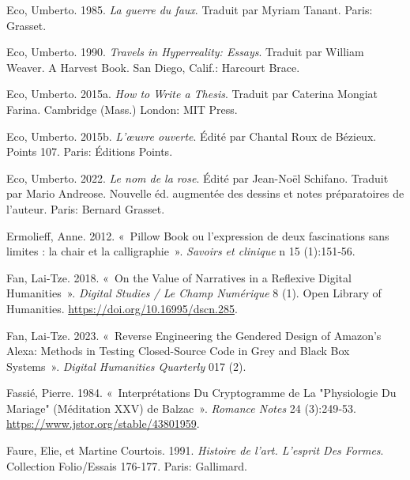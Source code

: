 \begin{CSLReferences}{1}{0}
\leavevmode{}%
Eco, Umberto. 1985. \emph{{La guerre du faux}}. Traduit par Myriam
Tanant. {Paris}: {Grasset}.

\leavevmode{}%
Eco, Umberto. 1990. \emph{Travels in {Hyperreality}: {Essays}}. Traduit
par William Weaver. A {Harvest} Book. {San Diego, Calif.}: {Harcourt
Brace}.

\leavevmode{}%
Eco, Umberto. 2015a. \emph{How to {Write} a {Thesis}}. Traduit par
Caterina Mongiat Farina. {Cambridge (Mass.) London}: {MIT Press}.

\leavevmode{}%
Eco, Umberto. 2015b. \emph{{L'{œ}uvre ouverte}}. Édité par Chantal Roux
de Bézieux. {Points} 107. {Paris}: {{É}ditions Points}.

\leavevmode{}%
Eco, Umberto. 2022. \emph{{Le nom de la rose}}. Édité par Jean-Noël
Schifano. Traduit par Mario Andreose. Nouvelle {é}d. augment{é}e des
dessins et notes pr{é}paratoires de l'auteur. {Paris}: {Bernard
Grasset}.

\leavevmode{}%
Ermolieff, Anne. 2012. {«~{Pillow Book ou l'expression de deux
fascinations sans limites : la chair et la calligraphie}~»}.
\emph{Savoirs et clinique} n{\textdegree} 15 (1):151‑56.

\leavevmode{}%
Fan, Lai-Tze. 2018. {«~On the {Value} of {Narratives} in a {Reflexive
Digital Humanities}~»}. \emph{Digital Studies / Le Champ Num{é}rique} 8
(1). {Open Library of Humanities}.
\url{https://doi.org/10.16995/dscn.285}.

\leavevmode{}%
Fan, Lai-Tze. 2023. {«~Reverse {Engineering} the {Gendered Design} of
{Amazon}'s {Alexa}: {Methods} in {Testing Closed-Source Code} in {Grey}
and {Black Box Systems}~»}. \emph{Digital Humanities Quarterly} 017 (2).

\leavevmode{}%
Fassié, Pierre. 1984. {«~Interpr{é}tations Du Cryptogramme de La
"{Physiologie} Du Mariage" ({M{é}ditation XXV}) de {Balzac}~»}.
\emph{Romance Notes} 24 (3):249‑53.
\url{https://www.jstor.org/stable/43801959}.

\leavevmode{}%
Faure, Elie, et Martine Courtois. 1991. \emph{Histoire de l'art.
{L}'esprit Des Formes}. Collection {Folio}/Essais 176-177. {Paris}:
{Gallimard}.


\end{CSLReferences}
